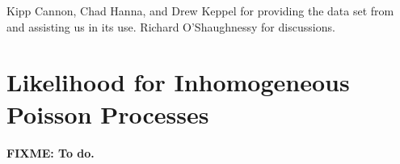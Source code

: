 \documentclass[aps,prd,reprint]{revtex4-1}
\newcommand{\fixme}[1]{\textbf{FIXME: #1}}
\begin{document}
\begin{acknowledgments}
  Kipp Cannon, Chad Hanna, and Drew Keppel for providing the data set
  from \citet{Cannon2012} and assisting us in its use. Richard
  O'Shaughnessy for discussions.
\end{acknowledgments}

\appendix

\section{Likelihood for Inhomogeneous Poisson Processes}
\label{sec:likelihood-derivation}

\fixme{To do.}



\end{document}

